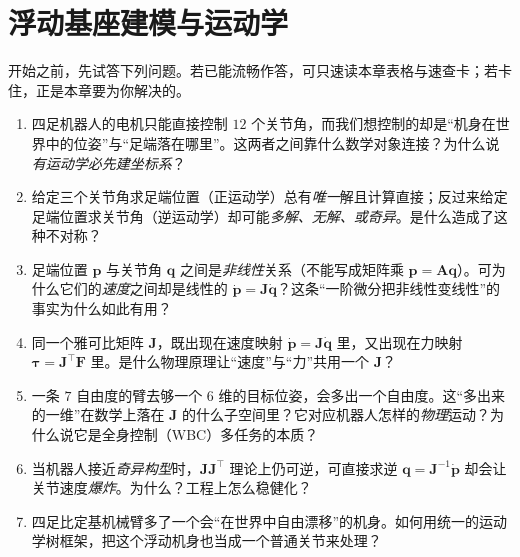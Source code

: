 \chapter{浮动基座建模与运动学}
\label{ch:quad_kin}


\begin{practice}[前置自测]
开始之前，先试答下列问题。若已能流畅作答，可只速读本章表格与速查卡；若卡住，正是本章要为你解决的。
\begin{enumerate}
  \item 四足机器人的电机只能直接控制 $12$ 个关节角，而我们想控制的却是“机身在世界中的位姿”与“足端落在哪里”。这两者之间靠什么数学对象连接？为什么说\emph{有运动学必先建坐标系}？
  \item 给定三个关节角求足端位置（正运动学）总有\emph{唯一}解且计算直接；反过来给定足端位置求关节角（逆运动学）却可能\emph{多解、无解、或奇异}。是什么造成了这种不对称？
  \item 足端位置 $\boldsymbol{p}$ 与关节角 $\boldsymbol{q}$ 之间是\emph{非线性}关系（不能写成矩阵乘 $\boldsymbol{p}=\mathbf{A}\boldsymbol{q}$）。可为什么它们的\emph{速度}之间却是线性的 $\dot{\boldsymbol{p}}=\mathbf{J}\dot{\boldsymbol{q}}$？这条“一阶微分把非线性变线性”的事实为什么如此有用？
  \item 同一个雅可比矩阵 $\mathbf{J}$，既出现在速度映射 $\dot{\boldsymbol{p}}=\mathbf{J}\dot{\boldsymbol{q}}$ 里，又出现在力映射 $\boldsymbol{\tau}=\mathbf{J}^\top\mathbf{F}$ 里。是什么物理原理让“速度”与“力”共用一个 $\mathbf{J}$？
  \item 一条 $7$ 自由度的臂去够一个 $6$ 维的目标位姿，会多出一个自由度。这“多出来的一维”在数学上落在 $\mathbf{J}$ 的什么子空间里？它对应机器人怎样的\emph{物理}运动？为什么说它是全身控制（WBC）多任务的本质？
  \item 当机器人接近\emph{奇异构型}时，$\mathbf{J}\mathbf{J}^\top$ 理论上仍可逆，可直接求逆 $\boldsymbol{q}=\mathbf{J}^{-1}\dot{\boldsymbol{p}}$ 却会让关节速度\emph{爆炸}。为什么？工程上怎么稳健化？
  \item 四足比定基机械臂多了一个会“在世界中自由漂移”的机身。如何用统一的运动学树框架，把这个浮动机身也当成一个普通关节来处理？
\end{enumerate}
\end{practice}

